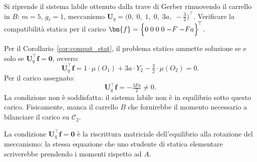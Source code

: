 \begin{esempio}
	\label{ex:gerber_labile_PLV}
	Si riprende il sistema labile ottenuto dalla trave di
	Gerber rimuovendo il carrello in $B$: $m = 5$,
	$g_\ell = 1$, meccanismo
	$\bm{U}_q = \bigl(0,\;0,\;1,\;0,\;3a,\;
	-\tfrac{3}{2}\bigr)^{\top}$.
	Verificare la compatibilità statica per il carico
	$\bm{f} = \Bigl\{0\; 0\; 0\; 0\; {-F}\;
	{-Fa}\Bigr\}^{\!\top}$.


\begin{svolgimento}
	
	Per il Corollario~\ref{cor:compat_stat}, il problema
	statico ammette soluzione se e solo se
	$\bm{U}_q^{\top}\bm{f} = \bm{0}$, ovvero:
	\begin{equation*}
		\bm{U}_q^{\top}\bm{f} =
		1\cdot \mu(O_1)
		+ 3a\cdot Y_2
		- \tfrac{3}{2}\cdot \mu(O_2) = 0.
	\end{equation*}
	Per il carico assegnato:
	\begin{equation*}
		\bm{U}_q^{\top}\bm{f} = -\tfrac{3Fa}{2} \neq 0.
	\end{equation*}
	La condizione non è soddisfatta: il sistema labile
	non è in equilibrio sotto questo carico. Fisicamente,
	manca il carrello $B$ che fornirebbe il momento
	necessario a bilanciare il carico su $\mathcal{C}_2$.
	
	\begin{oss}
		La condizione $\bm{U}_q^{\top}\bm{f} = \bm{0}$
		è la riscrittura matriciale dell'equilibrio alla
		rotazione del meccanismo: la stessa equazione che
		uno studente di statica elementare scriverebbe
		prendendo i momenti rispetto ad $A$.
	\end{oss}
	
\end{svolgimento}
\end{esempio}
